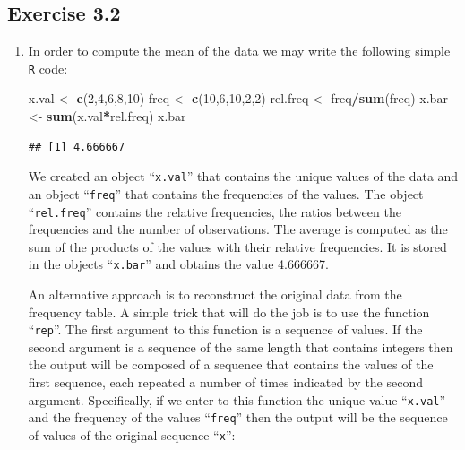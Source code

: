 \documentclass[
]{krantz}
\makeatletter
\newenvironment{Shaded}{\begin{snugshade}}{\end{snugshade}}
\newcommand{\DecValTok}[1]{\textcolor[rgb]{0.00,0.00,0.81}{#1}}
\newcommand{\KeywordTok}[1]{\textcolor[rgb]{0.13,0.29,0.53}{\textbf{#1}}}
\newcommand{\NormalTok}[1]{#1}
\newcommand{\OperatorTok}[1]{\textcolor[rgb]{0.81,0.36,0.00}{\textbf{#1}}}
\newcommand{\StringTok}[1]{\textcolor[rgb]{0.31,0.60,0.02}{#1}}
\newenvironment{kframe}{%
\medskip{}
\setlength{\fboxsep}{.8em}
 \def\at@end@of@kframe{}%
 \ifinner\ifhmode%
  \def\at@end@of@kframe{\end{minipage}}%
  \begin{minipage}{\columnwidth}%
 \fi\fi%
 \def\FrameCommand##1{\hskip\@totalleftmargin \hskip-\fboxsep
 \colorbox{shadecolor}{##1}\hskip-\fboxsep
     \hskip-\linewidth \hskip-\@totalleftmargin \hskip\columnwidth}%
 \MakeFramed {\advance\hsize-\width
   \@totalleftmargin\z@ \linewidth\hsize
   \@setminipage}}%
 {\par\unskip\endMakeFramed%
 \at@end@of@kframe}
\renewenvironment{Shaded}{\begin{kframe}}{\end{kframe}}
\theoremstyle{definition}
\theoremstyle{definition}
\theoremstyle{definition}
\theoremstyle{remark}
\makeatother
\begin{document}
\hypertarget{exercise-3.2}{%
\subsection*{Exercise 3.2}\label{exercise-3.2}}


\begin{enumerate}
\def\labelenumi{\arabic{enumi}.}
\item
  In order to compute the mean
  of the data we may write the following simple \texttt{R} code:

\begin{Shaded}
\begin{Highlighting}[]
\NormalTok{x.val <-}\StringTok{ }\KeywordTok{c}\NormalTok{(}\DecValTok{2}\NormalTok{,}\DecValTok{4}\NormalTok{,}\DecValTok{6}\NormalTok{,}\DecValTok{8}\NormalTok{,}\DecValTok{10}\NormalTok{)}
\NormalTok{freq <-}\StringTok{ }\KeywordTok{c}\NormalTok{(}\DecValTok{10}\NormalTok{,}\DecValTok{6}\NormalTok{,}\DecValTok{10}\NormalTok{,}\DecValTok{2}\NormalTok{,}\DecValTok{2}\NormalTok{)}
\NormalTok{rel.freq <-}\StringTok{ }\NormalTok{freq}\OperatorTok{/}\KeywordTok{sum}\NormalTok{(freq)}
\NormalTok{x.bar <-}\StringTok{ }\KeywordTok{sum}\NormalTok{(x.val}\OperatorTok{*}\NormalTok{rel.freq)}
\NormalTok{x.bar}
\end{Highlighting}
\end{Shaded}

\begin{verbatim}
## [1] 4.666667
\end{verbatim}

  We created an object ``\texttt{x.val}'' that contains the unique values of the
  data and an object ``\texttt{freq}'' that contains the frequencies of the values.
  The object ``\texttt{rel.freq}'' contains the relative frequencies, the ratios
  between the frequencies and the number of observations. The average is
  computed as the sum of the products of the values with their relative
  frequencies. It is stored in the objects ``\texttt{x.bar}'' and obtains the value
  4.666667.

  An alternative approach is to reconstruct the original data from the
  frequency table. A simple trick that will do the job is to use the
  function ``\texttt{rep}''. The first argument to this function is a sequence of
  values. If the second argument is a sequence of the same length that
  contains integers then the output will be composed of a sequence that
  contains the values of the first sequence, each repeated a number of
  times indicated by the second argument. Specifically, if we enter to
  this function the unique value ``\texttt{x.val}'' and the frequency of the values
  ``\texttt{freq}'' then the output will be the sequence of values of the original
  sequence ``\texttt{x}'':


\end{enumerate}
\end{document}
